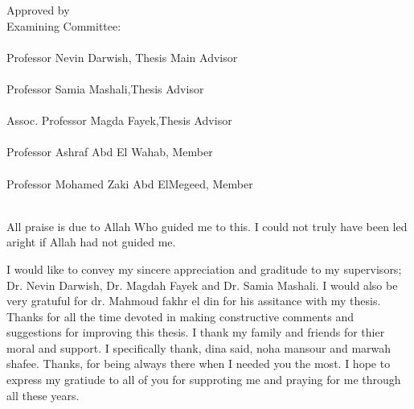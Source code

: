 \documentclass[11pt,doublespace]{Sketchthesis}
\begin{document}
    Approved by\\                                           
Examining Committee:\\
 \makebox[6in]{\hrulefill}\\ 
Professor Nevin Darwish, Thesis Main Advisor\\
 \makebox[6in]{\hrulefill}\\ 
Professor Samia Mashali,Thesis Advisor \\
 \makebox[6in]{\hrulefill}\\  
Assoc. Professor Magda Fayek,Thesis Advisor\\ 
 \makebox[6in]{\hrulefill}\\ 
Professor  Ashraf Abd El Wahab, Member\\
 \makebox[6in]{\hrulefill}\\ 
Professor Mohamed Zaki Abd ElMegeed, Member\\
 \makebox[6in]{\hrulefill}\\ 


\begin{acknowledgments}                                 %
All praise is due to Allah Who guided me to this. I could not truly have been led aright if
Allah had not guided me.

I would like to convey my sincere appreciation and graditude to my supervisors; Dr. Nevin Darwish, Dr. Magdah Fayek and Dr. Samia Mashali. I would also be very gratuful for dr. Mahmoud fakhr el din for his assitance with my thesis. Thanks for all the time devoted in making constructive comments and suggestions for improving this thesis. 
I thank my family and friends for thier moral and support. I specifically thank, dina said, noha mansour and marwah shafee. Thanks, for being always there when I needed you the most. I hope to express my gratiude to all of you for supproting me and praying for me through all these years. 
 \end{acknowledgments}                                   %
\end{document}

